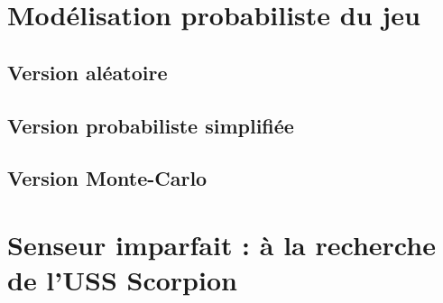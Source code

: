 \documentclass[12pt]{article}
\begin{document}
\section{Modélisation probabiliste du jeu}

\subsection{Version aléatoire}
\subsection{Version probabiliste simplifiée}
\subsection{Version Monte-Carlo}

\section{Senseur imparfait : à la recherche de l’USS Scorpion}

\subsection{}
\subsection{}
\subsection{}
\subsection{}
 
\end{document}
